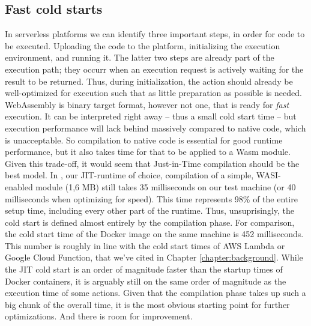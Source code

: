
\subsection{Fast cold starts}
In serverless platforms we can identify three important steps, in order for code to be executed. Uploading the code to the platform, initializing the execution environment, and running it. The latter two steps are already part of the execution path; they occurr when an execution request is actively waiting for the result to be returned. Thus, during initialization, the action should already be well-optimized for execution such that as little preparation as possible is needed. WebAssembly is binary target format, however not one, that is ready for \emph{fast} execution. It can be interpreted right away -- thus a small cold start time -- but execution performance will lack behind massively compared to native code, which is unacceptable. So compilation to native code is essential for good runtime performance, but it also takes time for that to be applied to a Wasm module. Given this trade-off, it would seem that Just-in-Time compilation should be the best model. In , our JIT-runtime of choice, compilation of a simple, WASI-enabled module (1,6 MB) still takes 35 milliseconds on our test machine (or 40 milliseconds when optimizing for speed). This time represents 98\% of the entire setup time, including every other part of the runtime. Thus, unsuprisingly, the cold start is defined almost entirely by the compilation phase. For comparison, the cold start time of the  Docker image on the same machine is 452 milliseconds. This number is roughly in line with the cold start times of AWS Lambda or Google Cloud Function, that we've cited in Chapter \ref{chapter:background}. While the JIT cold start is an order of magnitude faster than the startup times of Docker containers, it is arguably still on the same order of magnitude as the execution time of some actions. Given that the compilation phase takes up such a big chunk of the overall time, it is the most obvious starting point for further optimizations. And there is room for improvement.

